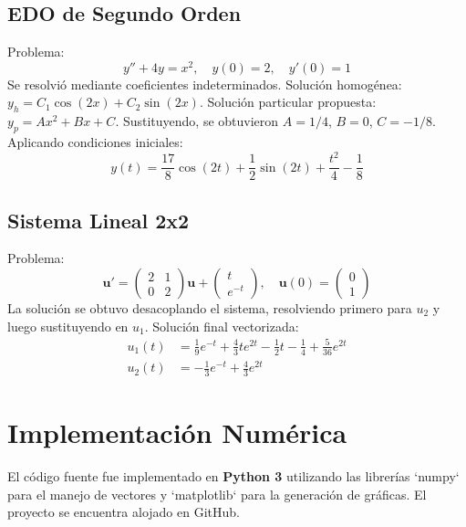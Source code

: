 	\section{EDO de Segundo Orden}
	Problema:
	\begin{equation}
		y'' + 4y = x^2, \quad y(0)=2, \quad y'(0)=1
	\end{equation}
	Se resolvió mediante coeficientes indeterminados.
	Solución homogénea: $y_h = C_1 \cos(2x) + C_2 \sin(2x)$.
	Solución particular propuesta: $y_p = Ax^2 + Bx + C$. Sustituyendo, se obtuvieron $A=1/4$, $B=0$, $C=-1/8$.
	Aplicando condiciones iniciales:
	\begin{equation}
		\boxed{y(t) = \frac{17}{8}\cos(2t) + \frac{1}{2}\sin(2t) + \frac{t^2}{4} - \frac{1}{8}}
	\end{equation}
	
	\section{Sistema Lineal 2x2}
	Problema:
	\begin{equation}
		\mathbf{u}' = \begin{pmatrix} 2 & 1 \\ 0 & 2 \end{pmatrix}\mathbf{u} + \begin{pmatrix} t \\ e^{-t} \end{pmatrix}, \quad \mathbf{u}(0) = \begin{pmatrix} 0 \\ 1 \end{pmatrix}
	\end{equation}
	La solución se obtuvo desacoplando el sistema, resolviendo primero para $u_2$ y luego sustituyendo en $u_1$.
	Solución final vectorizada:
	\begin{align}
		u_1(t) &= \frac{1}{9}e^{-t} + \frac{4}{3}te^{2t} - \frac{1}{2}t - \frac{1}{4} + \frac{5}{36}e^{2t} \\
		u_2(t) &= -\frac{1}{3}e^{-t} + \frac{4}{3}e^{2t}
	\end{align}
	
	\chapter{Implementación Numérica}
	El código fuente fue implementado en \textbf{Python 3} utilizando las librerías `numpy` para el manejo de vectores y `matplotlib` para la generación de gráficas. El proyecto se encuentra alojado en GitHub.
	
